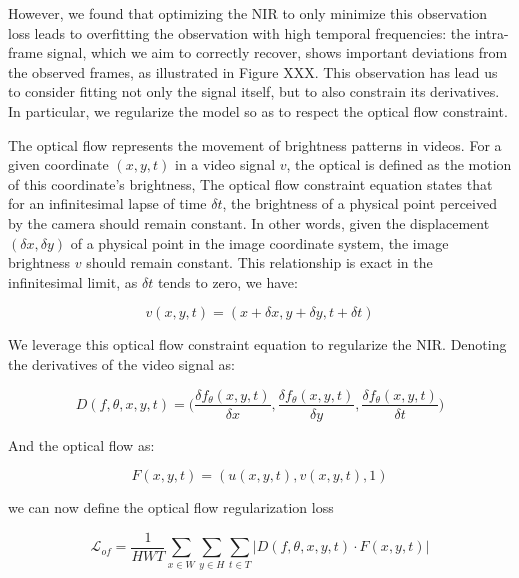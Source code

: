 \documentclass{article}
\begin{document}
However, we found that optimizing the NIR to only minimize this observation loss leads to overfitting the observation with high temporal frequencies:
the intra-frame signal, which we aim to correctly recover, shows important deviations from the observed frames, as illustrated in Figure XXX.
This observation has lead us to consider fitting not only the signal itself, but to also constrain its derivatives.
In particular, we regularize the model so as to respect the optical flow constraint.


The optical flow represents the movement of brightness patterns in videos.
For a given coordinate $(x,y,t)$ in a video signal $v$, the optical is defined as the motion of this coordinate's brightness,
The optical flow constraint equation states that for an infinitesimal lapse of time $\delta t$,
the brightness of a physical point perceived by the camera should remain constant.
In other words, given the displacement $(\delta x, \delta y)$ of a physical point in the image coordinate system,
the image brightness $v$ should remain constant.
This relationship is exact in the infinitesimal limit, as  $\delta t$ tends to zero, we have:

\begin{equation}
v(x, y, t)=(x + \delta x, y + \delta y, t + \delta t)
\end{equation}

We leverage this optical flow constraint equation to regularize the NIR.
Denoting the derivatives of the video signal as:

\begin{equation}
D(f, \theta, x, y, t)=\Big(\frac{\delta f_{\theta}(x,y,t)}{\delta x}, \frac{\delta f_{\theta}(x,y,t)}{\delta y}, \frac{\delta f_{\theta}(x,y,t)}{\delta t}\Big)
\end{equation}

And the optical flow as:

\begin{equation}
F(x, y, t)=(u(x,y,t), v(x,y,t), 1)
\end{equation}

we can now define the optical flow regularization loss

\begin{equation}
\mathcal{L}_{of} = \frac{1}{HWT} \sum_{x \in W}\sum_{y \in H}\sum_{t \in T} | D(f, \theta, x, y, t) \cdot F(x, y, t) |
\end{equation}
\end{document}
